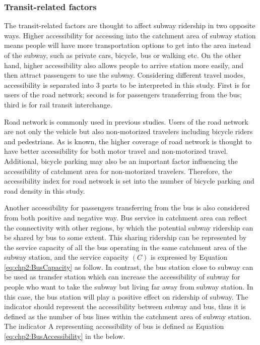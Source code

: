 \subsubsection{Transit-related factors}
%
The transit-related factors are thought to affect subway ridership in two opposite ways. Higher accessibility for accessing into the catchment area of subway station means people will have more transportation options to get into the area instead of the subway, such as private cars, bicycle, bus or walking etc. On the other hand, higher accessibility also allows people to arrive station more easily, and then attract passengers to use the subway. Considering different travel modes, accessibility is separated into 3 parts to be interpreted in this study. First is for users of the road network; second is for passengers transferring from the bus; third is for rail transit interchange.

%
Road network is commonly used in previous studies. Users of the road network are not only the vehicle but also non-motorized travelers including bicycle riders and pedestrians. As is known, the higher coverage of road network is thought to have better accessibility for both motor travel and non-motorized travel. Additional, bicycle parking may also be an important factor influencing the accessibility of catchment area for non-motorized travelers. Therefore, the accessibility index for road network is set into the number of bicycle parking and road density in this study.

%
Another accessibility for passengers transferring from the bus is also considered from both positive and negative way. Bus service in catchment area can reflect the connectivity with other regions, by which the potential subway ridership can be shared by bus to some extent. This sharing ridership can be represented by the service capacity of all the bus operating in the same catchment area of the subway station, and the service capacity $(C)$ is expressed by Equation \ref{eq:chp2:BusCapacity} as follow. In contrast, the bus station close to subway can be used as transfer station which can increase the accessibility of subway for people who want to take the subway but living far away from subway station. In this case, the bus station will play a positive effect on ridership of subway. The indicator should represent the accessibility between subway and bus, thus it is defined as the number of bus lines within the catchment area of subway station. The indicator A representing accessibility of bus is defined as Equation \ref{eq:chp2:BusAccessibility} in the below.

